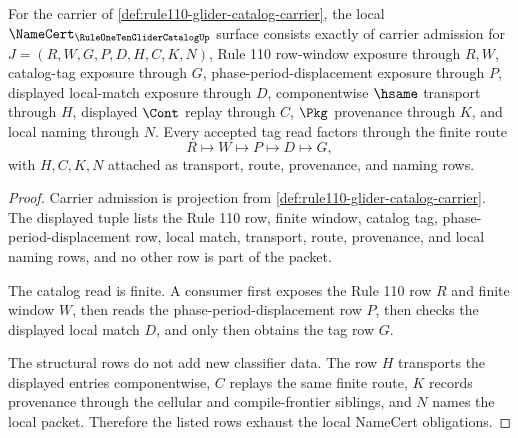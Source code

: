 \begin{theorem}
\label{thm:rule110-glider-catalog-namecert-obligations}
For the carrier of \autoref{def:rule110-glider-catalog-carrier}, the local $\NameCert_{\RuleOneTenGliderCatalogUp}$ surface consists exactly of carrier admission for $J=(R,W,G,P,D,H,C,K,N)$, Rule 110 row-window exposure through $R,W$, catalog-tag exposure through $G$, phase-period-displacement exposure through $P$, displayed local-match exposure through $D$, componentwise $\hsame$ transport through $H$, displayed $\Cont$ replay through $C$, $\Pkg$ provenance through $K$, and local naming through $N$. Every accepted tag read factors through the finite route
$$
R \longmapsto W \longmapsto P \longmapsto D \longmapsto G,
$$
with $H,C,K,N$ attached as transport, route, provenance, and naming rows.
\end{theorem}
\begin{proof}
Carrier admission is projection from \autoref{def:rule110-glider-catalog-carrier}. The displayed tuple lists the Rule 110 row, finite window, catalog tag, phase-period-displacement row, local match, transport, route, provenance, and local naming rows, and no other row is part of the packet.

The catalog read is finite. A consumer first exposes the Rule 110 row $R$ and finite window $W$, then reads the phase-period-displacement row $P$, then checks the displayed local match $D$, and only then obtains the tag row $G$.

The structural rows do not add new classifier data. The row $H$ transports the displayed entries componentwise, $C$ replays the same finite route, $K$ records provenance through the cellular and compile-frontier siblings, and $N$ names the local packet. Therefore the listed rows exhaust the local NameCert obligations.
\end{proof}

